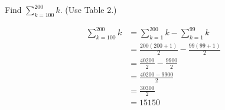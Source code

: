 
%
%
%

	Find $\sum_{k=100}^{200} k$. (Use Table 2.)

\solution
	\begin{align*}
		\sum_{k=100}^{200} k &= \sum_{k=1}^{200} k - \sum_{k=1}^{99} k  \\
		                     &= \frac{200(200 + 1)}{2} - \frac{99(99 + 1)}{2} \\
		                     &= \frac{40200}{2} - \frac{9900}{2} \\
		                     &= \frac{40200 - 9900}{2} \\
		                     &= \frac{30300}{2} \\
		                     &= 15150
	\end{align*}
